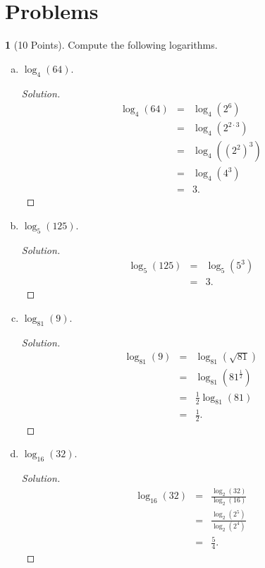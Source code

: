 \documentclass[12pt]{amsart}
\theoremstyle{definition}
\newtheorem{thm}{}
\begin{document}
\newpage

\section{Problems}

\begin{thm}[10 Points]
  Compute the following logarithms.
  \begin{enumerate}[(a)]
  \item
    $\log_{4}(64)$.
    \begin{proof}[Solution]
      \begin{eqnarray*}
        \log_4(64) &=& \log_4(2^6)\\
        &=& \log_4(2^{2\cdot 3})\\
        &=& \log_4((2^2)^3)\\
        &=& \log_4(4^3)\\
        &=& 3.
      \end{eqnarray*}
    \end{proof}
  \item
    $\log_{5}(125)$.
    \begin{proof}[Solution]
      \begin{eqnarray*}
        \log_5(125) &=& \log_5(5^3)\\
        &=& 3.
      \end{eqnarray*}
    \end{proof}
  \item
    $\log_{81}(9)$.
    \begin{proof}[Solution]
      \begin{eqnarray*}
        \log_{81}(9) &=& \log_{81}(\sqrt{81})\\
        &=& \log_{81}(81^{\frac{1}{2}})\\
        &=& \frac{1}{2}\log_{81}(81)\\
        &=& \frac{1}{2}.
      \end{eqnarray*}
    \end{proof}
  \item
    $\log_{16}(32)$.
    \begin{proof}[Solution]
      \begin{eqnarray*}
        \log_{16}(32) &=& \frac{\log_2(32)}{\log_2(16)}\\
        &=& \frac{\log_2(2^5)}{\log_2(2^4)}\\
        &=& \frac{5}{4}.
      \end{eqnarray*}
    \end{proof}
  \end{enumerate}
\end{thm}
\end{document}
